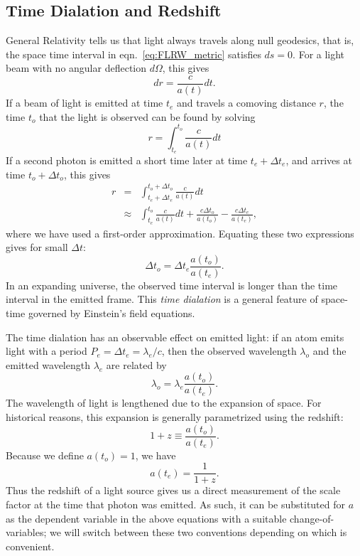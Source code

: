 \subsection{Time Dialation and Redshift}
\label{sec:redshift}
General Relativity tells us
that light always travels along null geodesics, that is, the space time
interval in eqn.~\ref{eq:FLRW_metric} satisfies $ds = 0$.  For a light
beam with no angular deflection $d\Omega$, this gives
\begin{equation}
  dr = \frac{c}{a(t)} dt.
\end{equation}
If a beam of light is emitted at time $t_e$ and travels
a comoving distance $r$, the
time $t_o$ that the light is observed can be found by solving
\begin{equation}
  r = \int_{t_e}^{t_o} \frac{c}{a(t)} dt
\end{equation}
If a second photon is emitted a short time later at time $t_e + \Delta t_e$,
and arrives at time $t_o + \Delta t_o$, this gives
\begin{eqnarray}
  r &=& 
  \int_{t_e + \Delta t_e}^{t_o + \Delta t_o} \frac{c}{a(t)} dt \nonumber\\
  &\approx& \int_{t_e}^{t_o} \frac{c}{a(t)} dt + \frac{c\Delta t_o}{a(t_o)}
  - \frac{c\Delta t_e}{a(t_e)},
\end{eqnarray}
where we have used a first-order approximation.  Equating these
two expressions gives for small $\Delta t$:
\begin{equation}
  \label{eq:time_dialation}
  \Delta t_o = \Delta t_e \frac{a(t_o)}{a(t_e)}.
\end{equation}
In an expanding universe, the observed time interval is longer than
the time interval in the emitted frame.  This {\it time dialation} is
a general feature of space-time governed by Einstein's field equations.

The time dialation has an observable effect on emitted light:
if an atom emits light with a period 
$P_e = \Delta t_e = \lambda_e / c$, then the observed wavelength $\lambda_o$
and the emitted wavelength $\lambda_e$ are related by
\begin{equation}
  \lambda_o = \lambda_e \frac{a(t_o)}{a(t_e)}.
\end{equation}
The wavelength of light is lengthened due to the expansion of space.  For
historical reasons, this expansion is generally parametrized using the
redshift:
\begin{equation}
  1 + z \equiv \frac{a(t_o)}{a(t_e)}.
\end{equation}
Because we define $a(t_o) = 1$, we have
\begin{equation}
  a(t_e) = \frac{1}{1 + z}.
\end{equation}
Thus the redshift of a light source gives us a direct measurement of the
scale factor at the time that photon was emitted.  As such, it can be
substituted for $a$ as the dependent variable in the above equations
with a suitable change-of-variables; we will switch between these two
conventions depending on which is convenient.

